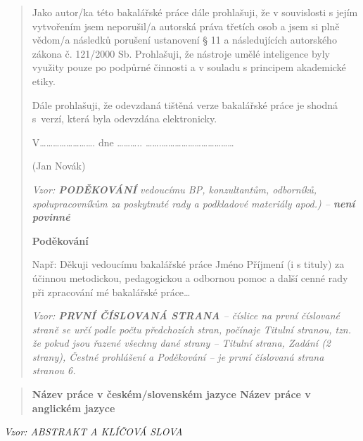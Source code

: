\documentclass[
]{article}
\begin{document}
\begin{quote}
        Jako autor/ka této bakalářské práce dále prohlašuji, že v souvislosti s
        jejím vytvořením jsem neporušil/a autorská práva třetích osob a jsem si
        plně vědom/a následků porušení ustanovení § 11 a následujících
        autorského zákona č. 121/2000 Sb. Prohlašuji, že nástroje umělé inteligence byly využity pouze po podpůrné činnosti a v souladu s principem akademické etiky.

        Dále prohlašuji, že odevzdaná tištěná verze bakalářské práce je shodná
        s~verzí, která byla odevzdána elektronicky.

        V\ldots\ldots\ldots\ldots\ldots\ldots\ldots\ldots. dne
        \ldots\ldots\ldots..
        \ldots\ldots.\ldots\ldots\ldots\ldots\ldots\ldots\ldots\ldots\ldots\ldots\ldots{}

        (Jan Novák)

        \newpage
        \thispagestyle{empty}
        \emph{Vzor: \textbf{PODĚKOVÁNÍ} vedoucímu BP, konzultantům, odborníků,
            spolupracovníkům za poskytnuté rady a podkladové materiály apod.) --
            \textbf{není povinné}}

        \textbf{Poděkování}

        Např: Děkuji vedoucímu bakalářské práce Jméno Příjmení (i s tituly) za
        účinnou metodickou, pedagogickou a odbornou pomoc a další cenné rady při
        zpracování mé bakalářské práce\ldots{}

        \newpage
        \emph{Vzor: \textbf{PRVNÍ ČÍSLOVANÁ STRANA} -- číslice na první
        číslované straně se určí podle počtu předchozích stran, počínaje Titulní
        stranou, tzn. že pokud jsou řazené všechny dané strany -- Titulní
        strana, Zadání (2 strany), Čestné prohlášení a Poděkování -- je první
        číslovaná strana stranou 6.}
    \end{quote}

    \begin{quote}
        \textbf{Název práce v českém/slovenském jazyce Název práce v anglickém
        jazyce}
    \end{quote}

    \emph{Vzor: ABSTRAKT A KLÍČOVÁ SLOVA}
\end{document}
